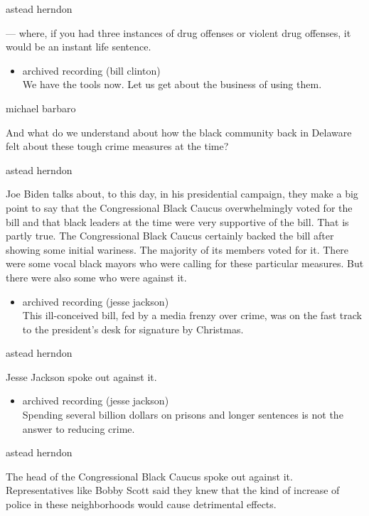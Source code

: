 astead herndon

--- where, if you had three instances of drug offenses or violent drug
offenses, it would be an instant life sentence.

\begin{itemize}
\tightlist
\item
  archived recording (bill clinton)\\
  We have the tools now. Let us get about the business of using them.
\end{itemize}

michael barbaro

And what do we understand about how the black community back in Delaware
felt about these tough crime measures at the time?

astead herndon

Joe Biden talks about, to this day, in his presidential campaign, they
make a big point to say that the Congressional Black Caucus
overwhelmingly voted for the bill and that black leaders at the time
were very supportive of the bill. That is partly true. The Congressional
Black Caucus certainly backed the bill after showing some initial
wariness. The majority of its members voted for it. There were some
vocal black mayors who were calling for these particular measures. But
there were also some who were against it.

\begin{itemize}
\tightlist
\item
  archived recording (jesse jackson)\\
  This ill-conceived bill, fed by a media frenzy over crime, was on the
  fast track to the president's desk for signature by Christmas.
\end{itemize}

astead herndon

Jesse Jackson spoke out against it.

\begin{itemize}
\tightlist
\item
  archived recording (jesse jackson)\\
  Spending several billion dollars on prisons and longer sentences is
  not the answer to reducing crime.
\end{itemize}

astead herndon

The head of the Congressional Black Caucus spoke out against it.
Representatives like Bobby Scott said they knew that the kind of
increase of police in these neighborhoods would cause detrimental
effects.

